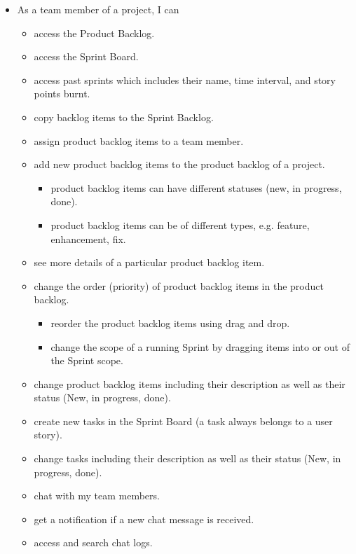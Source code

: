 \documentclass[
	accentcolor=tud1a %
]{tudreport}
\begin{document}
{\begin{itemize}
	\item  As a team member of a project, I can
	\begin{itemize}
		\item access the Product Backlog.
		\item access the Sprint Board.
		\item access past sprints which includes their name, time interval, and story points burnt.
		\item copy backlog items to the Sprint Backlog.
		\item assign product backlog items to a team member.
		\item add new product backlog items to the product backlog of a project.
		\begin{itemize}
			\item product backlog items can have different statuses (new, in progress, done).
			\item product backlog items can be of different types, e.g. feature, enhancement, fix.
		\end{itemize}
		\item see more details of a particular product backlog item.
		\item change the order (priority) of product backlog items in the product backlog.
		\begin{itemize}
			\item reorder the product backlog items using drag and drop.
			\item change the scope of a running Sprint by dragging items into or out of the Sprint scope.
		\end{itemize}
		\item change product backlog items including their description as well as their status (New, in progress, done).
		\item create new tasks in the Sprint Board (a task always belongs to a user story).
		\item change tasks including their description as well as their status (New, in progress, done).
		\item chat with my team members.
		\item get a notification if a new chat message is received.
		\item access and search chat logs.
	\end{itemize}
	

\end{itemize}}
\end{document}
